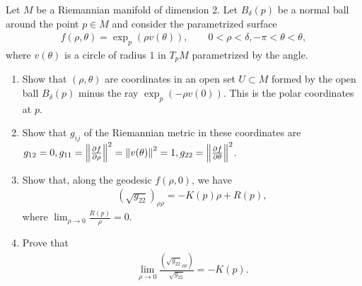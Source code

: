 \documentclass[12pt]{article}
\begin{document}
\begin{problem}[5.6]
Let $ M$ be a Riemannian manifold of dimension 2. Let  $ B_{ \delta}(p)$ be a normal ball around the point $ p \in M$ and consider the parametrized surface
\begin{align*}
	f(\rho, \theta) = \exp_p(\rho v(\theta)), \qquad 0<\rho< \delta, -\pi < \theta < \theta,
\end{align*}
where $ v(\theta)$ is a circle of radius $ 1$ in  $ T_pM$ parametrized by the angle.
 \begin{enumerate}[label=(\alph*)]
	\item Show that $ (\rho, \theta)$ are coordinates in an open set $ U \subset M$ formed by the open ball $ B_{ \delta}(p) $ minus the ray $ \exp_p(-\rho v(0))$. This is the polar coordinates at $ p$. 
	\item Show that $ g_{ij}$ of the Riemannian metric in these coordinates are $ g_{12} =0, g_{11} = {\left\lVert{ \frac{\partial f}{\partial \rho} }\right\rVert}^2 = {\left\lVert{ v(\theta)}\right\rVert}^2=  1, g_{22} = {\left\lVert{ \frac{\partial f}{\partial \theta} }\right\rVert}^2$.
	\item Show that, along the geodesic $ f(\rho,0)$, we have
		\begin{align*}
			(\sqrt{g_{22}} )_{\rho \rho} = -K(p) \rho+R(p),
		\end{align*}
		where $ \lim_{ \rho \to 0} \frac{R(p)}{ \rho} = 0$.
	\item Prove that
		\begin{align*}
			\lim_{ \rho \to 0} \frac{(\sqrt{g_{22}}_{\rho \rho} )}{\sqrt{g_{ 22}}  } =-K(p) .
		\end{align*}
\end{enumerate}
\end{problem}
\end{document}
